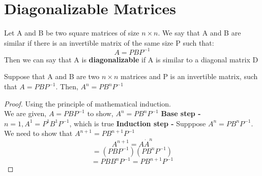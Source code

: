 \documentclass[twoside]{report}
\begin{document}
\section{Diagonalizable Matrices} %
\label{sec:Diagonalizable Matrices}

\begin{definition}
	Let A and B be two square matrices of size $n \times n$. We say that A and B are similar if there is an invertible matrix of the same size P such that: 
	\[
	   A = PBP^{-1}
	\]
	Then we can say that A is \textbf{diagonalizable} if A is similar to a diagonal matrix D
	\label{dfn1}
\end{definition}
\begin{lemma}
   Suppose that A and B are two $n \times n$ matrices and P is an invertible matrix, such that $A = PBP^{-1}.$ Then, $A^{n} = PB^{n}P^{-1}$ 
\end{lemma}
\begin{proof}
	Using the principle of mathematical induction.\\
	We are given, $A = PBP^{-1}$
	to show, $A^{n} = PB^{n}P^{-1}$
	\textbf{Base step - } $n = 1, A^{1} = P^1 B^1 P^{-1}$, which is true 
	\textbf{Induction step - } Supppose $A^{n} = PB^{n}P^{-1}$. We need to show that $A^{n+1} = PB^{n+1}P^{-1}$
	\[
	   A^{n+1} = A \dot A^{n}
	\]
	\[
	   = (PBP^{-1})(PB^n P^{-1})
	\]
	\[
	   = PBB^nP^{-1} = PB^{n+1}P^{-1}
	\]
\end{proof}
\end{document}
